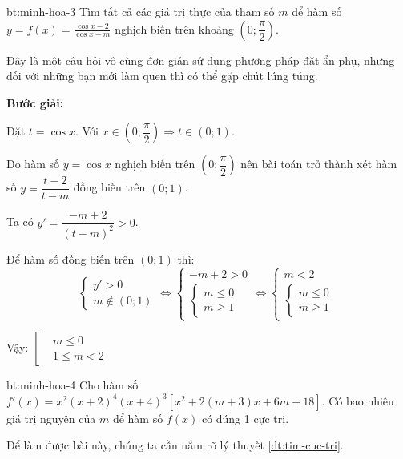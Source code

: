 \begin{cauhoi}{bt:minh-hoa-3}
    Tìm tất cả các giá trị thực của tham số $m$ để hàm số $y= f(x) = \frac{\cos x - 2}{\cos x - m}$ nghịch biến trên khoảng $(0; \dfrac{\pi}{2})$.
\end{cauhoi}

\begin{loigiai}
    Đây là một câu hỏi vô cùng đơn giản sử dụng phương pháp đặt ẩn phụ, nhưng đối với những bạn mới làm quen thì có thể gặp chút lúng túng.
    
    \textbf{Bước giải:}
    
    Đặt $t = \cos x$. Với $x \in \left(0; \dfrac{\pi}{2}\right) \Rightarrow t \in (0; 1)$.
    
    Do hàm số $y = \cos x$ nghịch biến trên $\left(0; \dfrac{\pi}{2}\right)$ nên bài toán trở thành xét hàm số $y = \dfrac{t - 2}{t - m}$ đồng biến trên $(0; 1)$.
    
    Ta có $y' = \dfrac{-m + 2}{(t - m)^2} > 0$.
    
    Để hàm số đồng biến trên $(0; 1)$ thì:
    \[
        \begin{cases}
            y' > 0 \\
            m \notin (0; 1)
        \end{cases}
        \Leftrightarrow
        \begin{cases}
            -m + 2 > 0 \\
            \begin{cases}
                m \leq 0 \\
                m \geq 1
            \end{cases}
        \end{cases}
        \Leftrightarrow
        \begin{cases}
            m < 2 \\
            \begin{cases}
                m \leq 0 \\
                m \geq 1
            \end{cases}
        \end{cases}
    \]

    Vậy:
    $
        \left[
        \begin{aligned}
            &m \leq 0 \\
            &1 \leq m < 2
        \end{aligned}
        \right.
    $
\end{loigiai}

\begin{cauhoi}{bt:minh-hoa-4}
    Cho hàm số $f'(x) = x^2 (x+2)^4 (x+4)^3 [x^2 + 2(m+3)x + 6m + 18]$.
    Có bao nhiêu giá trị nguyên của $m$ để hàm số $f(x)$ có đúng 1 cực trị.
\end{cauhoi}

\begin{loigiai}
    Để làm được bài này, chúng ta cần nắm rõ lý thuyết \ref{:lt:tim-cuc-tri}.

\end{loigiai}